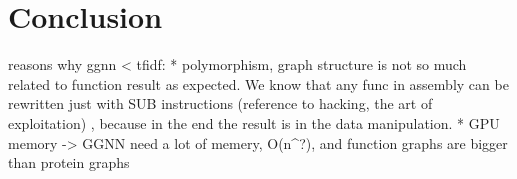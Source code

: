 \newpage
\section{Conclusion}



reasons why ggnn < tfidf:
* polymorphism, graph structure is not so much related to function result as expected. We know that any func in assembly can be rewritten just with SUB instructions (reference to hacking, the art of exploitation) , because in the end the result is in the data manipulation.
* GPU memory -> GGNN need a lot of memery, O(n^?), and function graphs are bigger than protein graphs
